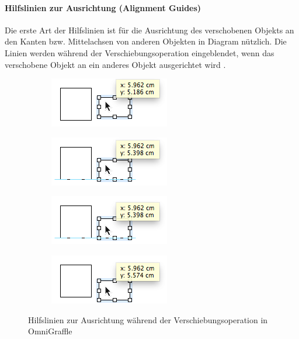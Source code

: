 \paragraph{Hilfslinien zur Ausrichtung (Alignment Guides)}

Die erste Art der Hilfslinien ist für die Ausrichtung des verschobenen Objekts an den Kanten bzw. Mittelachsen von anderen Objekten in Diagram nützlich. Die Linien werden während der Verschiebungsoperation eingeblendet, wenn das verschobene Objekt an ein anderes Objekt ausgerichtet wird \cite{11Keynote}.

\begin{figure}[hbt]
    \newcommand{\subfigurewidth}{0.5\textwidth}
    \begin{subfigure}{\subfigurewidth}
        \centering
        \includegraphics{resources/omnigraffle-smart-guides-a}
        \caption{}
        \label{fig:omnigraffle-smart-guides-a}
    \end{subfigure}
    \begin{subfigure}{\subfigurewidth}
        \centering
        \includegraphics{resources/omnigraffle-smart-guides-b}
        \caption{}
        \label{fig:omnigraffle-smart-guides-b}
    \end{subfigure}
    \begin{subfigure}{\subfigurewidth}
        \centering
        \includegraphics{resources/omnigraffle-smart-guides-c}
        \caption{}
        \label{fig:omnigraffle-smart-guides-c}
    \end{subfigure}
    \begin{subfigure}{\subfigurewidth}
        \centering
        \includegraphics{resources/omnigraffle-smart-guides-d}
        \caption{}
        \label{fig:omnigraffle-smart-guides-d}
    \end{subfigure}
    \caption{Hilfslinien zur Ausrichtung während der Verschiebungsoperation in OmniGraffle}
    \label{fig:omnigraffle-smart-guides}
\end{figure}

